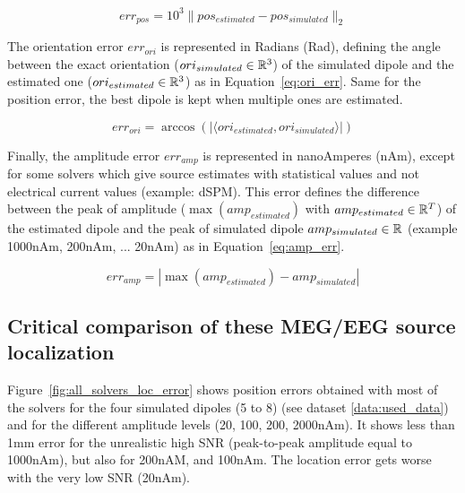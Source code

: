 \begin{equation}\label{eq:pos_err}
err_{pos} = 10^3 \|pos_{estimated} - pos_{simulated}\|_2
\end{equation}

The orientation error $err_{ori}$ is represented in Radians (Rad), defining the angle between the exact orientation ($ori_{simulated}\in\mathbb{R}^3$) of the simulated dipole and the estimated one ($ori_{estimated}\in\mathbb{R}^3$) as in Equation~\eqref{eq:ori_err}. Same for the position error, the best dipole is kept when multiple ones are estimated.

\begin{equation}\label{eq:ori_err}
err_{ori} = \arccos(|\langle ori_{estimated}, ori_{simulated} \rangle|)
\end{equation}

Finally, the amplitude error $err_{amp}$ is represented in nanoAmperes (nAm), except for some solvers which give source estimates with statistical values and not electrical current values (example: dSPM). This error defines the difference between the peak of amplitude ($\max(amp_{estimated})$ with $amp_{estimated}\in\mathbb{R}^T$) of the estimated dipole and the peak of simulated dipole $amp_{simulated}\in\mathbb{R}$ (example 1000nAm, 200nAm, ... 20nAm) as in Equation~\eqref{eq:amp_err}.

\begin{equation}\label{eq:amp_err}
err_{amp} = |\max(amp_{estimated}) - amp_{simulated}|
\end{equation}

\subsection{Critical comparison of these MEG/EEG source localization}

Figure~\ref{fig:all_solvers_loc_error} shows position errors obtained with most of the solvers for the four simulated dipoles (5 to 8) (see dataset \ref{data:used_data}) and for the different amplitude levels (20, 100, 200, 2000nAm). It shows less than 1mm error for the unrealistic high \ac{SNR} (peak-to-peak amplitude equal to 1000nAm), but also for 200nAM, and 100nAm. The location error gets worse with the very low SNR (20nAm).

